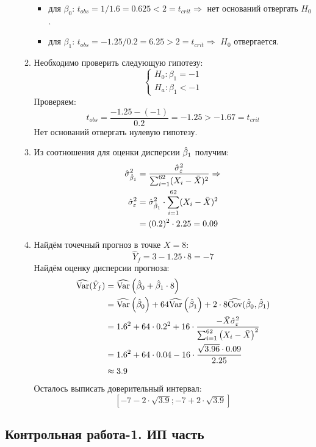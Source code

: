 \begin{enumerate}
\begin{enumerate}
\begin{itemize}
\item для $\beta_0$: $t_{obs} = 1 / 1.6 = 0.625 < 2 = t_{crit} \Rightarrow$
нет оснований отвергать $H_0$.
\item для $\beta_1$: $t_{obs} = -1.25 / 0.2 = 6.25 > 2 = t_{crit} \Rightarrow$
$H_0$ отвергается.
\end{itemize}
\item Необходимо проверить следующую гипотезу:
\[
\begin{cases}
H_0: \beta_1 = -1 \\
H_a: \beta_1 < -1
\end{cases}
\]
Проверяем:
\[
t_{obs} = \frac{-1.25 - (-1)}{0.2} = -1.25 > -1.67 = t_{crit}
\]
Нет оснований отвергать нулевую гипотезу.
\item Из соотношения для оценки дисперсии $\hat{\beta}_1$ получим:
\begin{align*}
\hat{\sigma}^2_{\hat{\beta}_1} &= \frac{\hat{\sigma}^2_{\varepsilon}}{\sum_{i=1}^{62}(X_i - \bar X)^2} \Rightarrow \\
\hat{\sigma}^2_{\varepsilon} &= \hat{\sigma}^2_{\hat{\beta}_1} \cdot \sum_{i=1}^{62}(X_i - \bar X)^2 \\
&= (0.2)^2 \cdot 2.25 = 0.09
\end{align*}
\item Найдём точечный прогноз в точке $X = 8$:
\[
\hat Y_f = 3 - 1.25 \cdot 8 = -7
\]
Найдём оценку дисперсии прогноза:
\begin{align*}
\widehat{\operatorname{Var}}(\hat Y_f) &= \widehat{\operatorname{Var}} \left(\hat{\beta}_0 + \hat{\beta}_1 \cdot 8 \right) \\
&= \widehat{\operatorname{Var}} \left(\hat{\beta}_0\right) + 64 \widehat{\operatorname{Var}} \left(\hat{\beta}_1 \right) + 2 \cdot 8 \widehat{\operatorname{Cov}}(\hat{\beta}_0, \hat{\beta}_1) \\
&= 1.6^2 + 64 \cdot 0.2^2 + 16 \cdot \frac{-\bar X \hat{\sigma}^2_{\varepsilon}}{\sum_{i=1}^{62}\left(X_i - \bar X\right)^2} \\
&= 1.6^2 + 64 \cdot 0.04 - 16 \cdot \frac{\sqrt{3.96} \cdot 0.09}{2.25} \\
&\approx 3.9
\end{align*}
Осталось выписать доверительный интервал:
\[
\left[-7 -2 \cdot \sqrt{3.9}; -7 + 2 \cdot \sqrt{3.9} \right]
\]
\end{enumerate}
\end{enumerate}


\subsection{Контрольная работа-1. ИП часть}

